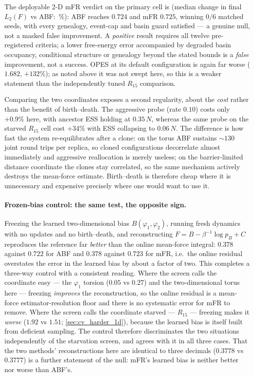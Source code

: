 The deployable 2-D mFR verdict on the primary cell is \textbf{\CvTwoDmFRVerdict}
(median change in final $L_2(F)$ vs ABF: \CvTwoDmFRRelFinal\,\%): ABF reaches $0.724$ and mFR
$0.725$, winning $0/6$ matched seeds, with every genealogy, event-cap and basin guard satisfied
--- a genuine null, not a masked false improvement. A \emph{positive} result requires all
twelve pre-registered criteria; a lower free-energy error accompanied by degraded basin
occupancy, conditional structure or genealogy beyond the stated bounds is a \emph{false}
improvement, not a success. OPES at its default configuration is again far worse ($1.682$,
$+132\%$); as noted above it was not swept here, so this is a weaker statement than the
independently tuned $R_{15}$ comparison.

Comparing the two coordinates exposes a second regularity, about the \emph{cost} rather than
the benefit of birth--death. The aggressive probe (rate $0.10$) costs only $+0.9\%$ here, with
ancestor ESS holding at $0.35\,N$, whereas the same probe on the starved $R_{15}$ cell cost
$+34\%$ with ESS collapsing to $0.06\,N$. The difference is how fast the system re-equilibrates
after a clone: on the torus ABF sustains ${\sim}130$ joint round trips per replica, so cloned
configurations decorrelate almost immediately and aggressive reallocation is merely useless;
on the barrier-limited distance coordinate the clones stay correlated, so the same mechanism
actively destroys the mean-force estimate. Birth--death is therefore cheap where it is
unnecessary and expensive precisely where one would want to use it.

\paragraph{Frozen-bias control: the same test, the opposite sign.} Freezing the learned
two-dimensional bias $B(\varphi_1,\varphi_2)$, running fresh dynamics with no updates and no
birth--death, and reconstructing $F=B-\beta^{-1}\log p_B+C$ reproduces the reference far
\emph{better} than the online mean-force integral: $0.378$ against $0.722$ for ABF and $0.378$
against $0.723$ for mFR, i.e.\ the online residual overstates the error in the learned bias by
about a factor of two. This completes a three-way control with a consistent reading. Where the
screen calls the coordinate easy --- the $\varphi_1$ torsion ($0.05$ vs $0.27$) and the
two-dimensional torus here --- freezing \emph{improves} the reconstruction, so the online
residual is a mean-force estimator-resolution floor and there is no systematic error for mFR
to remove. Where the screen calls the coordinate starved --- $R_{15}$ --- freezing makes it
\emph{worse} ($1.92$ vs $1.51$; \cref{sec:cv_harder_1d}), because the learned bias is itself
built from deficient sampling. The control therefore discriminates the two situations
independently of the starvation screen, and agrees with it in all three cases. That the two
methods' reconstructions here are identical to three decimals ($0.3778$ vs $0.3777$) is a
further statement of the null: mFR's learned bias is neither better nor worse than ABF's.


